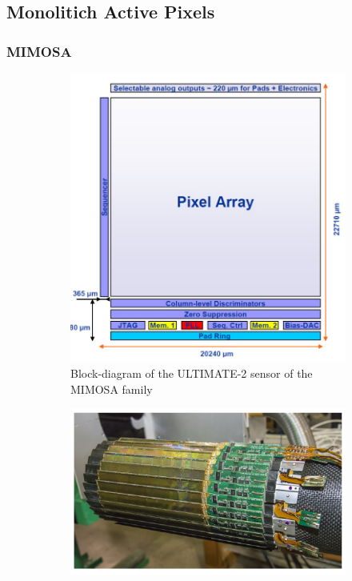     \subsection{Monolitich Active Pixels}
    \subsubsection{MIMOSA}
    \begin{figure}
            \centering
            \begin{subfigure}[b]{0.49\textwidth}
                \centering
                \includegraphics[width=\linewidth]{figures/pixel_detectors_usage/MIMOSA.png}          
                \caption{Block-diagram of the ULTIMATE-2 sensor of the MIMOSA family}
                \label{fig:MIMOSA}
            \end{subfigure}
            \hfill
            \begin{subfigure}[b]{0.49\textwidth}
                \centering
                \includegraphics[width=\linewidth]{figures/pixel_detectors_usage/STAR.png}

\end{subfigure}
\end{figure}
